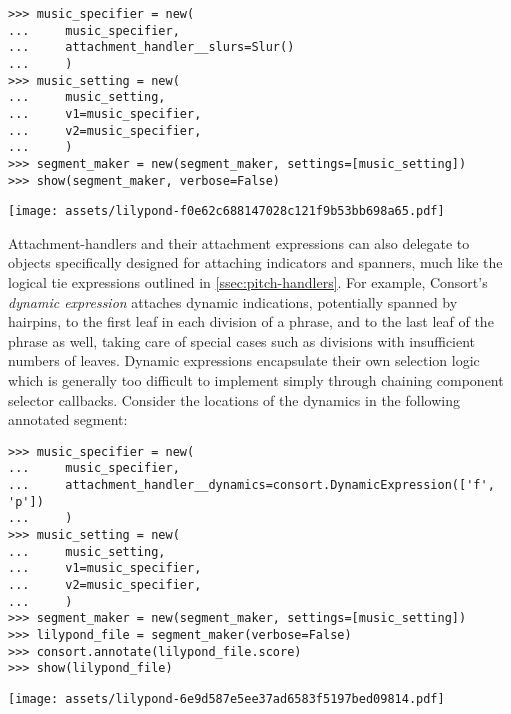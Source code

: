 \begin{abjadbookoutput}
\begin{singlespacing}
\vspace{-0.5\baselineskip}
\begin{lstlisting}
>>> music_specifier = new(
...     music_specifier,
...     attachment_handler__slurs=Slur()
...     )
>>> music_setting = new(
...     music_setting,
...     v1=music_specifier,
...     v2=music_specifier,
...     )
>>> segment_maker = new(segment_maker, settings=[music_setting])
>>> show(segment_maker, verbose=False)
\end{lstlisting}
\noindent\texttt{[image: assets/lilypond-f0e62c688147028c121f9b53bb698a65.pdf]}
\end{singlespacing}
\end{abjadbookoutput}

\noindent Attachment-handlers and their attachment expressions can also
delegate to objects specifically designed for attaching indicators and
spanners, much like the logical tie expressions outlined in
\autoref{ssec:pitch-handlers}. For example, Consort's \emph{dynamic expression}
attaches dynamic indications, potentially spanned by hairpins, to the first
leaf in each division of a phrase, and to the last leaf of the phrase as well,
taking care of special cases such as divisions with insufficient numbers of
leaves. Dynamic expressions encapsulate their own selection logic which is
generally too difficult to implement simply through chaining component selector
callbacks. Consider the locations of the dynamics in the following annotated
segment:

\begin{comment}
<abjad>[stylesheet=../consort.ily]
music_specifier = new(
    music_specifier,
    attachment_handler__dynamics=consort.DynamicExpression(['f', 'p'])
    )
music_setting = new(
    music_setting,
    v1=music_specifier,
    v2=music_specifier,
    )
segment_maker = new(segment_maker, settings=[music_setting])
lilypond_file = segment_maker(verbose=False)
consort.annotate(lilypond_file.score)
show(lilypond_file)
</abjad>
\end{comment}

\begin{abjadbookoutput}
\begin{singlespacing}
\vspace{-0.5\baselineskip}
\begin{lstlisting}
>>> music_specifier = new(
...     music_specifier,
...     attachment_handler__dynamics=consort.DynamicExpression(['f', 'p'])
...     )
>>> music_setting = new(
...     music_setting,
...     v1=music_specifier,
...     v2=music_specifier,
...     )
>>> segment_maker = new(segment_maker, settings=[music_setting])
>>> lilypond_file = segment_maker(verbose=False)
>>> consort.annotate(lilypond_file.score)
>>> show(lilypond_file)
\end{lstlisting}
\noindent\texttt{[image: assets/lilypond-6e9d587e5ee37ad6583f5197bed09814.pdf]}
\end{singlespacing}
\end{abjadbookoutput}

